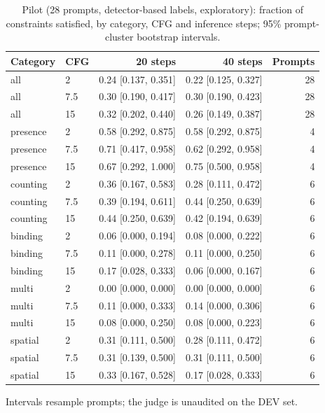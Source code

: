 \begin{table}[t]
\centering\small
\caption{Pilot (28 prompts, detector-based labels, exploratory): fraction of constraints satisfied, by category, CFG and inference steps; 95\% prompt-cluster bootstrap intervals.}
\label{tab:pilot-adherence}
\begin{tabular}{llrrr}
\toprule
Category & CFG & 20 steps & 40 steps & Prompts \\
\midrule
all & 2 & 0.24 [0.137, 0.351] & 0.22 [0.125, 0.327] & 28 \\
all & 7.5 & 0.30 [0.190, 0.417] & 0.30 [0.190, 0.423] & 28 \\
all & 15 & 0.32 [0.202, 0.440] & 0.26 [0.149, 0.387] & 28 \\
presence & 2 & 0.58 [0.292, 0.875] & 0.58 [0.292, 0.875] & 4 \\
presence & 7.5 & 0.71 [0.417, 0.958] & 0.62 [0.292, 0.958] & 4 \\
presence & 15 & 0.67 [0.292, 1.000] & 0.75 [0.500, 0.958] & 4 \\
counting & 2 & 0.36 [0.167, 0.583] & 0.28 [0.111, 0.472] & 6 \\
counting & 7.5 & 0.39 [0.194, 0.611] & 0.44 [0.250, 0.639] & 6 \\
counting & 15 & 0.44 [0.250, 0.639] & 0.42 [0.194, 0.639] & 6 \\
binding & 2 & 0.06 [0.000, 0.194] & 0.08 [0.000, 0.222] & 6 \\
binding & 7.5 & 0.11 [0.000, 0.278] & 0.11 [0.000, 0.250] & 6 \\
binding & 15 & 0.17 [0.028, 0.333] & 0.06 [0.000, 0.167] & 6 \\
multi & 2 & 0.00 [0.000, 0.000] & 0.00 [0.000, 0.000] & 6 \\
multi & 7.5 & 0.11 [0.000, 0.333] & 0.14 [0.000, 0.306] & 6 \\
multi & 15 & 0.08 [0.000, 0.250] & 0.08 [0.000, 0.223] & 6 \\
spatial & 2 & 0.31 [0.111, 0.500] & 0.28 [0.111, 0.472] & 6 \\
spatial & 7.5 & 0.31 [0.139, 0.500] & 0.31 [0.111, 0.500] & 6 \\
spatial & 15 & 0.33 [0.167, 0.528] & 0.17 [0.028, 0.333] & 6 \\
\bottomrule
\end{tabular}
\par\smallskip\footnotesize Intervals resample prompts; the judge is unaudited on the DEV set.
\end{table}
